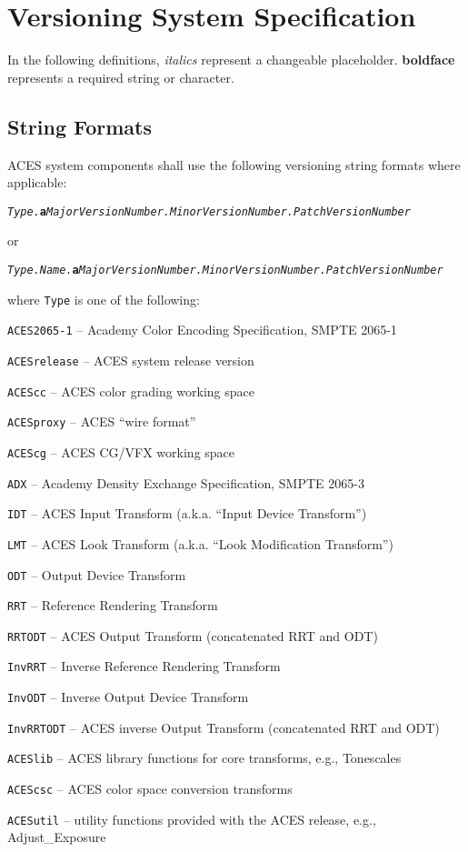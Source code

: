 \regularsectionformat
\chapter{Versioning System Specification}
In the following definitions, \textit{italics} represent a changeable placeholder. \textbf{boldface} represents a required string or character.

\section{String Formats}
ACES system components shall use the following versioning string formats where applicable:

\texttt{\textit{Type.}\textbf{a}\textit{MajorVersionNumber.MinorVersionNumber.PatchVersionNumber}}

or

\texttt{\textit{Type.Name.}\textbf{a}\textit{MajorVersionNumber.MinorVersionNumber.PatchVersionNumber}}

where \texttt{Type} is one of the following:

\begin{listize}
    \item \texttt{ACES2065-1} -- Academy Color Encoding Specification, SMPTE 2065-1
    \item \texttt{ACESrelease} -- ACES system release version
    \item \texttt{ACEScc} -- ACES color grading working space
    \item \texttt{ACESproxy} -- ACES ``wire format''
    \item \texttt{ACEScg} -- ACES CG/VFX working space
    \item \texttt{ADX} -- Academy Density Exchange Specification, SMPTE 2065-3
    \item \texttt{IDT} -- ACES Input Transform (a.k.a. ``Input Device Transform'')
    \item \texttt{LMT} -- ACES Look Transform (a.k.a. ``Look Modification Transform'')
    \item \texttt{ODT} -- Output Device Transform
    \item \texttt{RRT} -- Reference Rendering Transform
    \item \texttt{RRTODT} -- ACES Output Transform (concatenated RRT and ODT)
    \item \texttt{InvRRT} -- Inverse Reference Rendering Transform
    \item \texttt{InvODT} -- Inverse Output Device Transform
    \item \texttt{InvRRTODT} -- ACES inverse Output Transform (concatenated RRT and ODT)
    \item \texttt{ACESlib} -- ACES library functions for core transforms, e.g., Tonescales
    \item \texttt{ACEScsc} -- ACES color space conversion transforms
    \item \texttt{ACESutil} -- utility functions provided with the ACES release, e.g., Adjust_Exposure
\end{listize}

